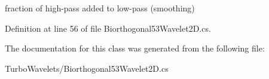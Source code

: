 fraction of high-\/pass added to low-\/pass (smoothing) 



\-Definition at line 56 of file \-Biorthogonal53\-Wavelet2\-D.\-cs.



\-The documentation for this class was generated from the following file\-:\begin{DoxyCompactItemize}
\item 
\-Turbo\-Wavelets/\-Biorthogonal53\-Wavelet2\-D.\-cs\end{DoxyCompactItemize}
